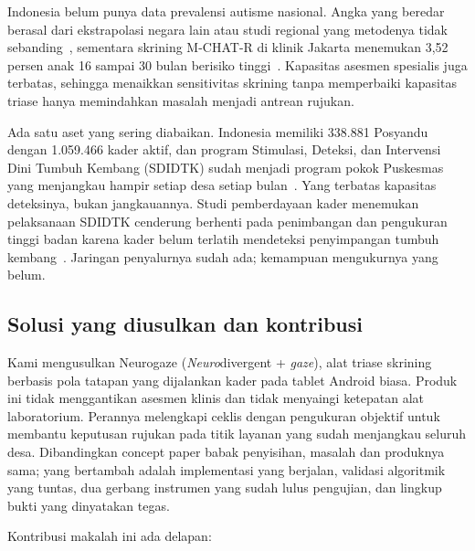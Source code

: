 \documentclass{article}
\begin{document}
Indonesia belum punya data prevalensi autisme nasional. Angka yang beredar berasal dari
ekstrapolasi negara lain atau studi regional yang metodenya tidak
sebanding~\cite{fathmawati2023}, sementara skrining M-CHAT-R di klinik Jakarta menemukan 3,52
persen anak 16 sampai 30 bulan berisiko tinggi~\cite{aditya2021}. Kapasitas asesmen spesialis
juga terbatas, sehingga menaikkan sensitivitas skrining tanpa memperbaiki kapasitas triase
hanya memindahkan masalah menjadi antrean rujukan.

Ada satu aset yang sering diabaikan. Indonesia memiliki 338.881 Posyandu dengan 1.059.466
kader aktif, dan program Stimulasi, Deteksi, dan Intervensi Dini Tumbuh Kembang (SDIDTK)
sudah menjadi program pokok Puskesmas yang menjangkau hampir setiap desa setiap
bulan~\cite{kemenkopmk2023}. Yang terbatas kapasitas deteksinya, bukan jangkauannya. Studi
pemberdayaan kader menemukan pelaksanaan SDIDTK cenderung berhenti pada penimbangan dan
pengukuran tinggi badan karena kader belum terlatih mendeteksi penyimpangan tumbuh
kembang~\cite{mardhika2022}. Jaringan penyalurnya sudah ada; kemampuan mengukurnya yang
belum.

\subsection{Solusi yang diusulkan dan kontribusi}

Kami mengusulkan Neurogaze (\emph{Neuro}divergent + \emph{gaze}), alat triase skrining
berbasis pola tatapan yang dijalankan kader pada tablet Android biasa. Produk ini tidak
menggantikan asesmen klinis dan tidak menyaingi ketepatan alat laboratorium. Perannya
melengkapi ceklis dengan pengukuran objektif untuk membantu keputusan rujukan pada titik
layanan yang sudah menjangkau seluruh desa. Dibandingkan concept paper babak penyisihan,
masalah dan produknya sama; yang bertambah adalah implementasi yang berjalan, validasi
algoritmik yang tuntas, dua gerbang instrumen yang sudah lulus pengujian, dan lingkup bukti
yang dinyatakan tegas.

Kontribusi makalah ini ada delapan:
\end{document}
